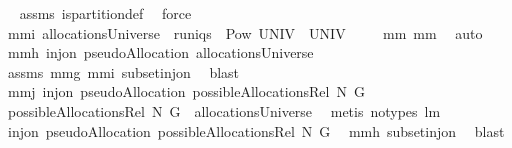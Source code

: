 \begin{isabellebody}
\isadelimproof
\ %
\endisadelimproof
%
\isatagproof
{}\isamarkupfalse%
\ assms\ is{\isacharunderscore}partition{\isacharunderscore}def\ \isamarkupfalse%
\ force%
\endisatagproof
{\isafoldproof}%
%
\isadelimproof
%
\endisadelimproof
\isanewline
{}\isamarkupfalse%
\ mm{}{}i{\isacharcolon}\ {\isachardoublequoteopen}allocationsUniverse\ {\isasymsubseteq}\ runiqs\ {\isasyminter}\ Pow\ {\isacharparenleft}UNIV\ {\isasymtimes}\ {\isacharparenleft}UNIV\ {\isacharminus}\ {\isacharbraceleft}{\isacharbraceleft}{\isacharbraceright}{\isacharbraceright}{\isacharparenright}{\isacharparenright}{\isachardoublequoteclose}%
\isadelimproof
\ %
\endisadelimproof
%
\isatagproof
{}\isamarkupfalse%
\ mm{}{}\ mm{}{}\ \isamarkupfalse%
\ auto%
\endisatagproof
{\isafoldproof}%
%
\isadelimproof
%
\endisadelimproof
\isanewline
{}\isamarkupfalse%
\ mm{}{}h{\isacharcolon}\ {\isachardoublequoteopen}inj{\isacharunderscore}on\ pseudoAllocation\ allocationsUniverse{\isachardoublequoteclose}%
\isadelimproof
\ %
\endisadelimproof
%
\isatagproof
{}\isamarkupfalse%
\ assms\ mm{}{}g\ mm{}{}i\ subset{\isacharunderscore}inj{\isacharunderscore}on\ \isamarkupfalse%
\ blast%
\endisatagproof
{\isafoldproof}%
%
\isadelimproof
%
\endisadelimproof
\isanewline
{}\isamarkupfalse%
\ mm{}{}j{\isacharcolon}\ {\isachardoublequoteopen}inj{\isacharunderscore}on\ pseudoAllocation\ {\isacharparenleft}possibleAllocationsRel\ N\ G{\isacharparenright}{\isachardoublequoteclose}\ \isanewline
%
\isadelimproof
%
\endisadelimproof
%
\isatagproof
{}\isamarkupfalse%
\ {\isacharminus}\isanewline
\ \ \isamarkupfalse%
\ {\isachardoublequoteopen}possibleAllocationsRel\ N\ G\ {\isasymsubseteq}\ allocationsUniverse{\isachardoublequoteclose}\ \isamarkupfalse%
\ {\isacharparenleft}metis\ {\isacharparenleft}no{\isacharunderscore}types{\isacharparenright}\ lm{}{}{\isacharparenright}\isanewline
\ \ \isamarkupfalse%
\ {\isachardoublequoteopen}inj{\isacharunderscore}on\ pseudoAllocation\ {\isacharparenleft}possibleAllocationsRel\ N\ G{\isacharparenright}{\isachardoublequoteclose}\ \isamarkupfalse%
\ mm{}{}h\ subset{\isacharunderscore}inj{\isacharunderscore}on\ \isamarkupfalse%
\ blast\isanewline

\end{isabellebody}
